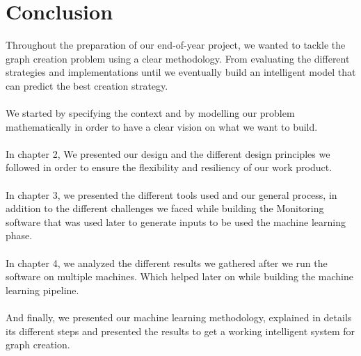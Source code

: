 \chapter*{Conclusion}

Throughout the preparation of our end-of-year project, we wanted to tackle the graph creation problem using a clear methodology. From evaluating the different strategies and implementations until we eventually build an intelligent model that can predict the best creation strategy.
\\
\\
We started by specifying the context and by modelling our problem mathematically in order to have a clear vision on what we want to build.
\\
\\
In chapter 2, We presented our design and the different design principles we followed in order to ensure the flexibility and resiliency of our work product.
\\
\\
In chapter 3, we presented the different tools used and our general process, in addition to the different challenges we faced while building the Monitoring software that was used later to generate inputs to be used the machine learning phase.
\\
\\
In chapter 4, we analyzed the different results we gathered after we run the software on multiple machines. Which helped later on while building the machine learning pipeline.
\\
\\
And finally, we presented our machine learning methodology, explained in details its different steps and presented the results to get a working intelligent system for graph creation.
